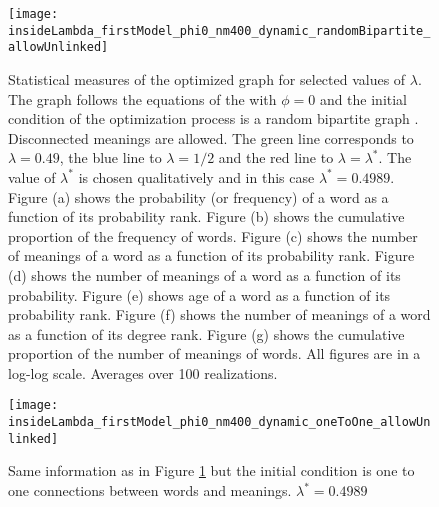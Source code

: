 \begin{figure}
  \centering
  \texttt{[image: insideLambda\_firstModel\_phi0\_nm400\_dynamic\_randomBipartite\_allowUnlinked]}
  \caption{
    Statistical measures of the optimized graph for selected values of $\lambda$.
    The graph follows the equations of the \firstmodel{} with $\phi=0$ and the initial condition of the optimization process is a random bipartite graph . Disconnected meanings are allowed.
    The green line corresponds to $\lambda=0.49$, the blue line to $\lambda=1/2$ and the red line to $\lambda=\lambda^*$.
    The value of $\lambda^*$ is chosen qualitatively and in this case $\lambda^*=0.4989$.
    Figure (a) shows the probability (or frequency) of a word as a function of its probability rank.
    Figure (b) shows the cumulative proportion of the frequency of words.
    Figure (c) shows the number of meanings of a word as a function of its probability rank.
    Figure (d) shows the number of meanings of a word as a function of its probability.
    Figure (e) shows age of a word as a function of its probability rank.
    Figure (f) shows the number of meanings of a word as a function of its degree rank.
    Figure (g) shows the cumulative proportion of the number of meanings of words.
    All figures are in a log-log scale.
    Averages over 100 realizations.
  }
  \label{fig:insideLambda_firstModel_phi0_nm400_dynamic_randomBipartite_allowUnlinked}
\end{figure}

\begin{figure}
  \centering
  \texttt{[image: insideLambda\_firstModel\_phi0\_nm400\_dynamic\_oneToOne\_allowUnlinked]}
  \caption{Same information as in Figure \ref{fig:insideLambda_firstModel_phi0_nm400_dynamic_randomBipartite_allowUnlinked} but the initial condition is one to one connections between words and meanings. $\lambda^* = 0.4989$}
  \label{fig:insideLambda_firstModel_phi0_nm400_dynamic_oneToOne_allowUnlinked}
\end{figure}

